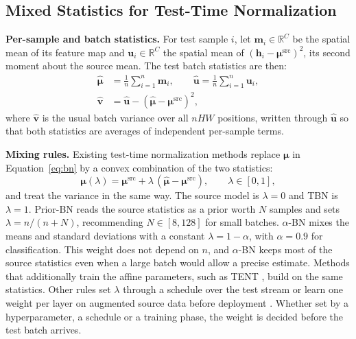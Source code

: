 \subsection{Mixed Statistics for Test-Time Normalization} \label{sec:base-paradigm}
\textbf{Per-sample and batch statistics.} For test sample $i$, let $\mathbf{m}_i \in \mathbb{R}^{C}$ be the spatial mean of its feature map and $\mathbf{u}_i \in \mathbb{R}^{C}$ the spatial mean of $(\mathbf{h}_i - \boldsymbol{\mu}^{\text{src}})^2$, its second moment about the source mean.
The test batch statistics are then:
\begin{equation}\label{eq:batch-stats}
\begin{aligned}
\hat{\boldsymbol{\mu}} &= \tfrac{1}{n}\textstyle\sum_{i=1}^{n} \mathbf{m}_i, \qquad \hat{\mathbf{u}} = \tfrac{1}{n}\textstyle\sum_{i=1}^{n} \mathbf{u}_i,\\
\hat{\mathbf{v}} &= \hat{\mathbf{u}} - (\hat{\boldsymbol{\mu}} - \boldsymbol{\mu}^{\text{src}})^{2},
\end{aligned}
\end{equation}
where $\hat{\mathbf{v}}$ is the usual batch variance over all $nHW$ positions, written through $\hat{\mathbf{u}}$ so that both statistics are averages of independent per-sample terms.

\textbf{Mixing rules.} Existing test-time normalization methods replace $\boldsymbol{\mu}$ in Equation~\ref{eq:bn} by a convex combination of the two statistics:
\begin{equation}\label{eq:mixing}
\boldsymbol{\mu}(\lambda) = \boldsymbol{\mu}^{\text{src}} + \lambda\,(\hat{\boldsymbol{\mu}} - \boldsymbol{\mu}^{\text{src}}), \qquad \lambda \in [0, 1],
\end{equation}
and treat the variance in the same way.
The source model is $\lambda{=}0$ and TBN \cite{PredictionBN} is $\lambda{=}1$.
Prior-BN \cite{BN-Adapt} reads the source statistics as a prior worth $N$ samples and sets $\lambda = n/(n+N)$, recommending $N \in [8, 128]$ for small batches.
$\alpha$-BN \cite{AlphaBN} mixes the means and standard deviations with a constant $\lambda = 1 - \alpha$, with $\alpha{=}0.9$ for classification.
This weight does not depend on $n$, and $\alpha$-BN keeps most of the source statistics even when a large batch would allow a precise estimate.
Methods that additionally train the affine parameters, such as TENT \cite{TENT}, build on the same statistics.
Other rules set $\lambda$ through a schedule over the test stream \cite{DUA} or learn one weight per layer on augmented source data before deployment \cite{TTN}.
Whether set by a hyperparameter, a schedule or a training phase, the weight is decided before the test batch arrives.

